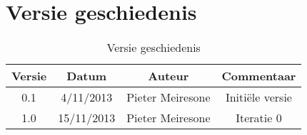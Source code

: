 \chapter{Versie geschiedenis}

\begin{table}[htbp]
	\centering
	\caption{Versie geschiedenis}
	\begin{tabular} {c|c|c|c}
		\textbf{Versie} & \textbf{Datum} 	& \textbf{Auteur} & \textbf{Commentaar} \\
		\hline
		0.1 			& 4/11/2013 		& Pieter Meiresone & Initi\"{e}le versie \\
		1.0 			& 15/11/2013		& Pieter Meiresone & Iteratie 0
	\end{tabular}
\end{table}
